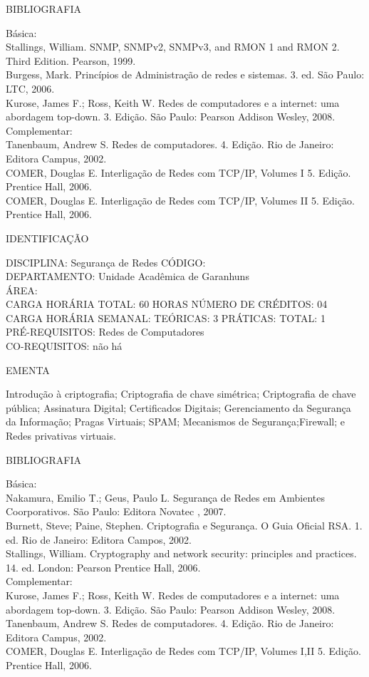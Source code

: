 \documentclass[
	12pt,				%
	openright,			%
  oneside,     %
	a4paper,			%
	english,			%
	french,				%
	spanish,			%
	brazil				%
	]{abntex2}
\begin{document}
\begin{apendicesenv}
BIBLIOGRAFIA 

Básica:\\
Stallings, William. SNMP, SNMPv2, SNMPv3, and RMON 1 and RMON 2. Third
Edition. Pearson, 1999.\\
Burgess, Mark. Princípios de Administração de redes e sistemas. 3. ed.
São Paulo: LTC, 2006.\\
Kurose, James F.; Ross, Keith W. Redes de computadores e a internet: uma
abordagem top-down. 3. Edição. São Paulo: Pearson Addison Wesley,
2008.\\
Complementar:\\
Tanenbaum, Andrew S. Redes de computadores. 4. Edição. Rio de Janeiro:
Editora Campus, 2002. \\
COMER, Douglas E. Interligação de Redes com TCP/IP, Volumes I 5. Edição.
Prentice Hall, 2006.\\
COMER, Douglas E. Interligação de Redes com TCP/IP, Volumes II 5. Edição. Prentice Hall, 2006.

\newpage IDENTIFICAÇÃO

DISCIPLINA: Segurança de Redes CÓDIGO:\\ 
DEPARTAMENTO: Unidade Acadêmica de Garanhuns\\ 
ÁREA: \\
CARGA HORÁRIA TOTAL: 60 HORAS NÚMERO DE CRÉDITOS: 04\\
CARGA HORÁRIA SEMANAL: TEÓRICAS: 3 PRÁTICAS: TOTAL: 1 \\
PRÉ-REQUISITOS: Redes de Computadores\\
CO-REQUISITOS: não há

EMENTA 

Introdução à criptografia; Criptografia de chave simétrica; Criptografia
de chave pública; Assinatura Digital; Certificados Digitais;
Gerenciamento da Segurança da Informação; Pragas Virtuais; SPAM;
Mecanismos de Segurança;Firewall; e Redes privativas virtuais.

BIBLIOGRAFIA 

Básica:\\
Nakamura, Emilio T.; Geus, Paulo L. Segurança de Redes em Ambientes
Coorporativos. São Paulo: Editora Novatec , 2007. \\
Burnett, Steve; Paine, Stephen. Criptografia e Segurança. O Guia Oficial
RSA. 1. ed. Rio de Janeiro: Editora Campos, 2002.\\
Stallings, William. Cryptography and network security: principles and
practices. 14. ed. London: Pearson Prentice Hall, 2006.\\
Complementar:\\
Kurose, James F.; Ross, Keith W. Redes de computadores e a internet: uma
abordagem top-down. 3. Edição. São Paulo: Pearson Addison Wesley, 2008.\\
Tanenbaum, Andrew S. Redes de computadores. 4. Edição. Rio de Janeiro:
Editora Campus, 2002. \\
COMER, Douglas E. Interligação de Redes com TCP/IP, Volumes I,II 5.
Edição. Prentice Hall, 2006.


\end{apendicesenv}
\end{document}
